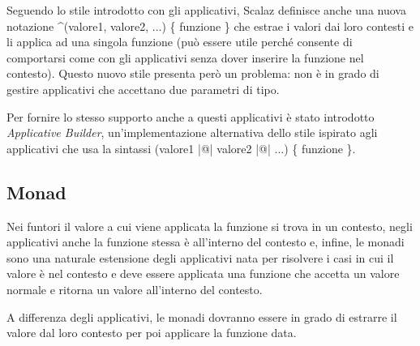 

Seguendo lo stile introdotto con gli applicativi, Scalaz definisce anche una nuova notazione \textasciicircum(valore1, valore2, ...) \{ funzione \} che estrae i valori dai loro contesti e li applica ad una singola funzione (può essere utile perché consente di comportarsi come con gli applicativi senza dover inserire la funzione nel contesto). Questo nuovo stile presenta però un problema: non è in grado di gestire applicativi che accettano due parametri di tipo.

Per fornire lo stesso supporto anche a questi applicativi è stato introdotto \textit{Applicative Builder}, un'implementazione alternativa dello stile ispirato agli applicativi che usa la sintassi (valore1 |@| valore2 |@| ...) \{ funzione \}.



\subsection{Monad}

Nei funtori il valore a cui viene applicata la funzione si trova in un contesto, negli applicativi anche la funzione stessa è all'interno del contesto e, infine, le monadi sono una naturale estensione degli applicativi nata per risolvere i casi in cui il valore è nel contesto e deve essere applicata una funzione che accetta un valore normale e ritorna un valore all'interno del contesto.

A differenza degli applicativi, le monadi dovranno essere in grado di estrarre il valore dal loro contesto per poi applicare la funzione data.

